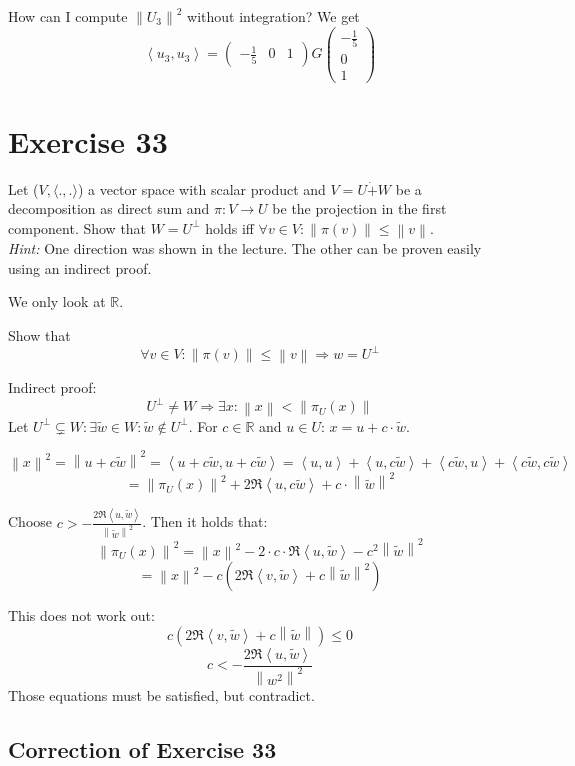 \documentclass[a4paper]{article}
\theoremstyle{definition}
\newcommand\fun[1]{\left\langle{#1}\right\rangle}
\newcommand\norm[1]{\left\|{#1}\right\|}
\begin{document}
How can I compute $\norm{U_3}^2$ without integration?
We get
\[ \fun{u_3, u_3} = \begin{pmatrix} -\frac15 & 0 & 1 \end{pmatrix} G \begin{pmatrix} -\frac15 \\ 0 \\ 1 \end{pmatrix} \]

\section{Exercise 33}
\begin{ex}
  Let ($V, \langle ., .\rangle$) a vector space with scalar product and $V = U \dot{+} W$ be a decomposition as direct sum and $\pi: V \to U$ be the projection in the first component.
  Show that $W = U^\bot$ holds iff $\forall v \in V: \norm{\pi(v)} \leq \norm{v}$. \\
  \emph{Hint:} One direction was shown in the lecture. The other can be proven easily using an indirect proof.
\end{ex}

We only look at $\mathbb R$.

Show that
\[ \forall v \in V: \norm{\pi(v)} \leq \norm{v} \Rightarrow w = U^\bot \]

Indirect proof:
\[ U^\bot \neq W \Rightarrow \exists x: \norm{x} < \norm{\pi_U(x)} \]
Let $U^\bot \subsetneq W: \exists \tilde{w} \in W: \tilde{w} \notin U^\bot$.
For $c \in \mathbb R$ and $u \in U$: $x = u + c \cdot \tilde{w}$.

\[ \norm{x}^2 = \norm{u + c \tilde{w}}^2 = \fun{u + c\tilde{w}, u + c \tilde{w}} = \fun{u,u} + \fun{u,c\tilde{w}} + \fun{c\tilde{w}, u} + \fun{c\tilde{w},c\tilde{w}} \]
\[ = \norm{\pi_U(x)}^2 + 2 \Re{\fun{u, c\tilde{w}}} + c\cdot\norm{\tilde{w}}^2 \]

Choose $c > -\frac{2\Re{\fun{u,\tilde{w}}}}{\norm{\tilde{w}}^2}$.
Then it holds that:
\[ \norm{\pi_U(x)}^2 = \norm{x}^2 - 2 \cdot c \cdot \Re{\fun{u,\tilde{w}}} - c^2 \norm{\tilde{w}}^2 \]
\[ = \norm{x}^2 - c (2 \Re{\fun{v,\tilde{w}}} + c \norm{\tilde{w}}^2) \]

This does not work out:
\[ c(2 \Re{\fun{v, \tilde{w}}} + c \norm{\tilde{w}}) \leq 0 \]
\[ c < -\frac{2\Re{\fun{u, \tilde{w}}}}{\norm{w^2}^2} \]
Those equations must be satisfied, but contradict.

\subsection{Correction of Exercise 33}
\end{document}
